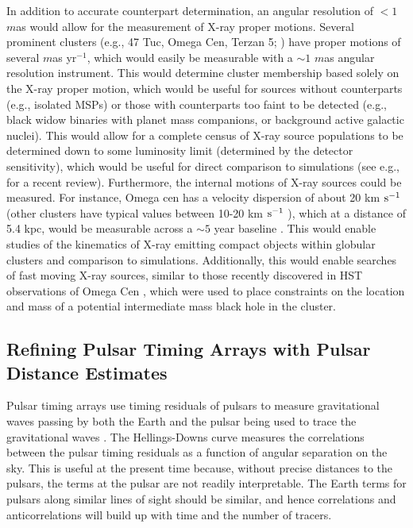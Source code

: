 \documentclass{article}
\begin{document}
In addition to accurate counterpart determination, an angular resolution of $<1$ $m$as would allow for the measurement of X-ray proper motions. Several prominent clusters (e.g., 47 Tuc, Omega Cen, Terzan 5; \cite{2018A&A...612A.115N,2018ApJ...854...45L,2015ApJ...810...69M}) have proper motions of several $m$as yr$^{-1}$, which would easily be measurable with a $\sim1$ $m$as angular resolution instrument. This would determine cluster membership based solely on the X-ray proper motion, which would be useful for sources without counterparts (e.g., isolated MSPs) or those with counterparts too faint to be detected (e.g., black widow binaries with planet mass companions, or background active galactic nuclei). This would allow for a complete census of X-ray source populations to be determined down to some luminosity limit (determined by the detector sensitivity), which would be useful for direct comparison to simulations (see e.g., \cite{2026enap....3..458K} for a recent review). Furthermore, the internal motions of X-ray sources could be measured. For instance, Omega cen has a velocity dispersion of about 20 km $\rm s^{-1}$ (other clusters have typical values between 10-20 km $\rm s^{-1}$ \cite{2019ApJ...875....1M,2019MNRAS.482.5138B}), which at a distance of 5.4 kpc, would be measurable across a $\sim5$ year baseline \cite{2025ApJ...983...95H}. This would enable studies of the kinematics of X-ray emitting compact objects within globular clusters and comparison to simulations. Additionally, this would enable searches of fast moving X-ray sources, similar to those recently discovered in HST observations of Omega Cen \cite{2024Natur.631..285H}, which were used to place constraints on the location and mass of a potential intermediate mass black hole in the cluster.



\subsection{Refining Pulsar Timing Arrays with Pulsar Distance Estimates}
Pulsar timing arrays \cite{2025Ap&SS.370..124T} use timing residuals of pulsars to measure gravitational waves passing by both the Earth and the pulsar being used to trace the gravitational waves \cite{2011MNRAS.414.3251L}. The Hellings-Downs curve \cite{1983ApJ...265L..39H} measures the correlations between the pulsar timing residuals as a function of angular separation on the sky. This is useful at the present time because, without precise distances to the pulsars, the terms at the pulsar are not readily interpretable. The Earth terms for pulsars along similar lines of sight should be similar, and hence correlations and anticorrelations will build up with time and the number of tracers.
\end{document}

